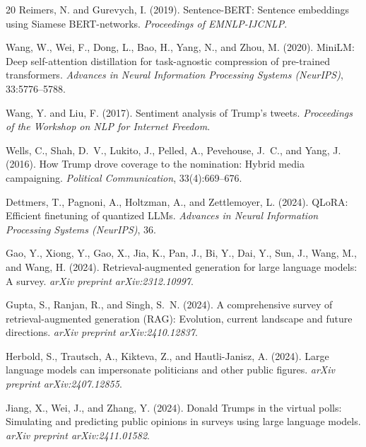 \documentclass[11pt,a4paper]{article}
\begin{document}
\begin{thebibliography}{20}
Reimers, N. and Gurevych, I. (2019).
\newblock Sentence-BERT: Sentence embeddings using Siamese BERT-networks.
\newblock \textit{Proceedings of EMNLP-IJCNLP}.

Wang, W., Wei, F., Dong, L., Bao, H., Yang, N., and Zhou, M. (2020).
\newblock MiniLM: Deep self-attention distillation for task-agnostic compression of pre-trained transformers.
\newblock \textit{Advances in Neural Information Processing Systems (NeurIPS)}, 33:5776--5788.

Wang, Y. and Liu, F. (2017).
\newblock Sentiment analysis of Trump's tweets.
\newblock \textit{Proceedings of the Workshop on NLP for Internet Freedom}.

Wells, C., Shah, D.~V., Lukito, J., Pelled, A., Pevehouse, J.~C., and Yang, J. (2016).
\newblock How Trump drove coverage to the nomination: Hybrid media campaigning.
\newblock \textit{Political Communication}, 33(4):669--676.

Dettmers, T., Pagnoni, A., Holtzman, A., and Zettlemoyer, L. (2024).
\newblock QLoRA: Efficient finetuning of quantized LLMs.
\newblock \textit{Advances in Neural Information Processing Systems (NeurIPS)}, 36.

Gao, Y., Xiong, Y., Gao, X., Jia, K., Pan, J., Bi, Y., Dai, Y., Sun, J., Wang, M., and Wang, H. (2024).
\newblock Retrieval-augmented generation for large language models: A survey.
\newblock \textit{arXiv preprint arXiv:2312.10997}.

Gupta, S., Ranjan, R., and Singh, S.~N. (2024).
\newblock A comprehensive survey of retrieval-augmented generation (RAG): Evolution, current landscape and future directions.
\newblock \textit{arXiv preprint arXiv:2410.12837}.

Herbold, S., Trautsch, A., Kikteva, Z., and Hautli-Janisz, A. (2024).
\newblock Large language models can impersonate politicians and other public figures.
\newblock \textit{arXiv preprint arXiv:2407.12855}.

Jiang, X., Wei, J., and Zhang, Y. (2024).
\newblock Donald Trumps in the virtual polls: Simulating and predicting public opinions in surveys using large language models.
\newblock \textit{arXiv preprint arXiv:2411.01582}.


\end{thebibliography}
\end{document}
